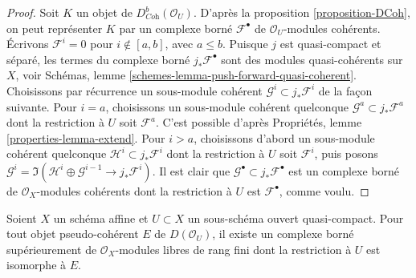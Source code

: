 \begin{proof}
Soit $K$ un objet de $D^b_{\textit{Coh}}(\mathcal{O}_U)$.
D'après la proposition \ref{proposition-DCoh}, on peut représenter $K$ par un complexe
borné $\mathcal{F}^\bullet$ de $\mathcal{O}_U$-modules cohérents.
Écrivons $\mathcal{F}^i = 0$ pour $i \not \in [a, b]$, avec $a \leq b$.
Puisque $j$ est quasi-compact et séparé, les termes du complexe borné
$j_*\mathcal{F}^\bullet$ sont des modules quasi-cohérents sur $X$, voir
Schémas, lemme \ref{schemes-lemma-push-forward-quasi-coherent}.
Choisissons par récurrence un sous-module cohérent
$\mathcal{G}^i \subset j_*\mathcal{F}^i$ de la façon suivante.
Pour $i = a$, choisissons un sous-module cohérent quelconque
$\mathcal{G}^a \subset j_*\mathcal{F}^a$ dont la restriction
à $U$ soit $\mathcal{F}^a$. C'est possible d'après
Propriétés, lemme \ref{properties-lemma-extend}.
Pour $i > a$, choisissons d'abord un sous-module cohérent quelconque
$\mathcal{H}^i \subset j_*\mathcal{F}^i$
dont la restriction à $U$ soit $\mathcal{F}^i$,
puis posons
$\mathcal{G}^i = \Im(\mathcal{H}^i \oplus \mathcal{G}^{i - 1}
\to j_*\mathcal{F}^i)$. Il est clair que
$\mathcal{G}^\bullet \subset j_*\mathcal{F}^\bullet$
est un complexe borné de $\mathcal{O}_X$-modules cohérents
dont la restriction à $U$ est $\mathcal{F}^\bullet$, comme voulu.
\end{proof}

\begin{lemma}
\label{lemma-lift-pseudo-coherent}
Soient $X$ un schéma affine et $U \subset X$ un sous-schéma ouvert
quasi-compact. Pour tout objet pseudo-cohérent $E$ de $D(\mathcal{O}_U)$,
il existe un complexe borné supérieurement de $\mathcal{O}_X$-modules libres de rang fini
dont la restriction à $U$ est isomorphe à $E$.
\end{lemma}

